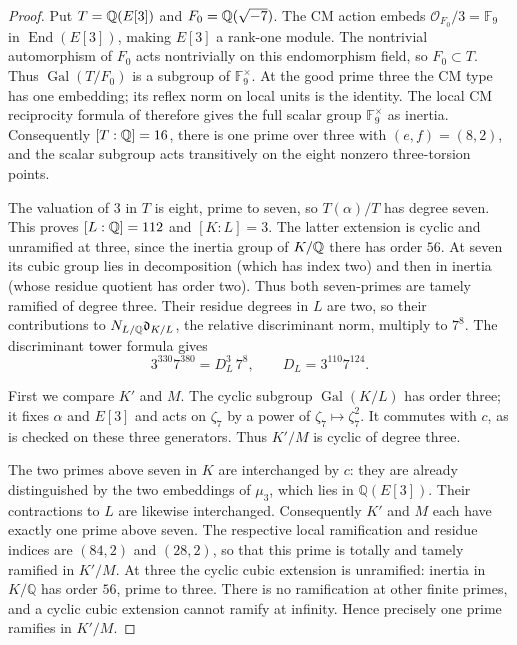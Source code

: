 \begin{proof}
Put $T=\mathbb Q(E[3])$ and $F_0=\mathbb Q(\sqrt{-7})$.
The CM action embeds $\mathcal O_{F_0}/3=\mathbb F_9$ in
$\operatorname{End}(E[3])$, making $E[3]$ a rank-one module.
The nontrivial automorphism of $F_0$ acts nontrivially on this
endomorphism field, so $F_0\subset T$. Thus
$\operatorname{Gal}(T/F_0)$ is a subgroup of $\mathbb F_9^\times$.
At the good prime three the CM type has one embedding; its
reflex norm on local units is the identity. The local CM reciprocity
formula of \citet[Theorem~5.1]{Lombardo2017} therefore gives the full
scalar group $\mathbb F_9^\times$ as inertia. Consequently
$[T:\mathbb Q]=16$, there is one prime over three with $(e,f)=(8,2)$,
and the scalar subgroup acts transitively on the eight nonzero
three-torsion points.

The valuation of $3$ in $T$ is eight, prime to seven, so
$T(\alpha)/T$ has degree seven. This proves $[L:\mathbb Q]=112$
and $[K:L]=3$. The latter extension is cyclic and unramified at
three, since the inertia group of $K/\mathbb Q$ there has order $56$.
At seven its cubic group lies in decomposition (which has index
two) and then in inertia (whose residue quotient has order two).
Thus both seven-primes are tamely ramified of degree three.
Their residue degrees in $L$ are two, so their contributions to
$N_{L/\mathbb Q}\mathfrak d_{K/L}$, the relative discriminant norm, multiply to $7^8$.
The discriminant tower formula gives
\[
 3^{330}7^{380}=D_L^3\,7^8,
 \qquad D_L=3^{110}7^{124}.
\]

First we compare $K'$ and $M$.  The cyclic subgroup
$\operatorname{Gal}(K/L)$ has order three; it fixes
$\alpha$ and $E[3]$ and acts on $\zeta_7$ by a power
of $\zeta_7\mapsto\zeta_7^2$.  It commutes with $c$,
as is checked on these three generators.  Thus $K'/M$
is cyclic of degree three.

The two primes above seven in $K$ are interchanged
by $c$: they are already distinguished by the two
embeddings of $\mu_3$, which lies in $\mathbb Q(E[3])$.
Their contractions to $L$ are likewise interchanged.
Consequently $K'$ and $M$ each have exactly one prime
above seven.  The respective local ramification and
residue indices are $(84,2)$ and $(28,2)$, so that
this prime is totally and tamely ramified in $K'/M$.
At three the cyclic cubic extension is unramified:
inertia in $K/\mathbb Q$ has order $56$, prime to
three.  There is no ramification at other finite
primes, and a cyclic cubic extension cannot ramify
at infinity.  Hence precisely one prime ramifies
in $K'/M$.


\end{proof}
